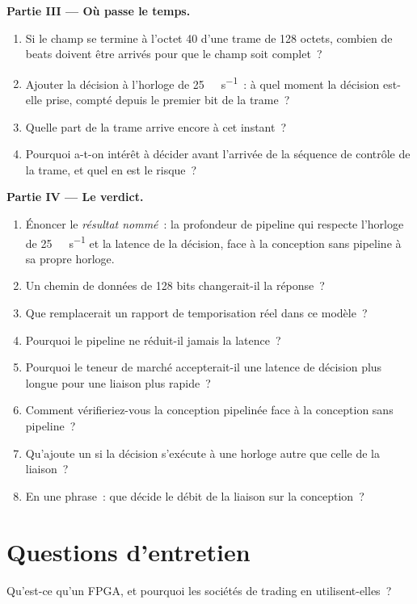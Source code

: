 \begin{problem}
\medskip\noindent\textbf{Partie III --- Où passe le temps.}
\begin{enumerate}[resume]
\item Si le champ se termine à l'octet 40 d'une trame de 128 octets, combien de beats doivent être arrivés pour que le champ soit complet~?
\item Ajouter la décision à l'horloge de \qty{25}{\giga\bit\per\second}~: à quel moment la décision est-elle prise, compté depuis le premier bit de la trame~?
\item Quelle part de la trame arrive encore à cet instant~?
\item Pourquoi a-t-on intérêt à décider avant l'arrivée de la séquence de contrôle de la trame, et quel en est le risque~?
\end{enumerate}

\medskip\noindent\textbf{Partie IV --- Le verdict.}
\begin{enumerate}[resume]
\item Énoncer le \emph{résultat nommé}~: la profondeur de pipeline qui respecte l'horloge de \qty{25}{\giga\bit\per\second} et la latence de la décision, face
  à la conception sans pipeline à sa propre horloge.
\item Un chemin de données de 128 bits changerait-il la réponse~?
\item Que remplacerait un rapport de temporisation réel dans ce modèle~?
\item Pourquoi le pipeline ne réduit-il jamais la latence~?
\item Pourquoi le teneur de marché accepterait-il une latence de décision plus longue pour une liaison plus rapide~?
\item Comment vérifieriez-vous la conception pipelinée face à la conception sans pipeline~?
\item Qu'ajoute un  si la décision s'exécute à une horloge autre que celle de la liaison~?
\item En une phrase~: que décide le débit de la liaison sur la conception~?
\end{enumerate}
\end{problem}

\section{Questions d'entretien}

\begin{interviewq}\label{iq:nw:programmable-hardware-i-architecture-and-toolchain:1}
Qu'est-ce qu'un FPGA, et pourquoi les sociétés de trading en utilisent-elles~?
\end{interviewq}


